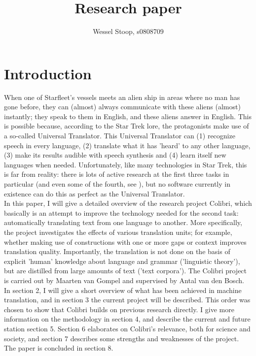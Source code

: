\documentclass[12pt]{article}
\title{Research paper}
\author{Wessel Stoop, s0808709}
\begin{document}
\maketitle

\section{Introduction}

When one of Starfleet's vessels meets an alien ship in areas where no man has gone before, they can (almost) always communicate with these aliens (almost) instantly; they speak to them in English, and these aliens answer in English. This is possible because, according to the Star Trek lore, the protagonists make use of a so-called Universal Translator. This Universal Translator can (1) recognize speech in every language, (2) translate what it has 'heard' to any other language, (3) make its results audible with speech synthesis and (4) learn itself new languages when needed. Unfortunately, like many technologies in Star Trek, this is far from reality: there is lots of active research at the first three tasks in particular (and even some of the fourth, see \citet{biemann11}), but no software currently in existence can do this as perfect as the Universal Translator. \\\indent
In this paper, I will give a detailed overview of the research project Colibri, which basically is an attempt to improve the technology needed for the second task: automatically translating text from one language to another. More specifically, the project investigates the effects of various translation units; for example, whether making use of constructions with one or more gaps or context improves translation quality. Importantly, the translation is not done on the basis of explicit 'human' knowledge about language and grammar ('linguistic theory'), but are distilled from large amounts of text ('text corpora'). The Colibri project is carried out by Maarten van Gompel and supervised by Antal van den Bosch.
\\\indent
In section 2, I will give a short overview of what has been achieved in machine translation, and in section 3 the current project will be described. This order was chosen to show that Colibri builds on previous research directly. I give more information on the methodology in section 4, and describe the current and future station section 5. Section 6 elaborates on Colibri's relevance, both for science and society, and section 7 describes some strengths and weaknesses of the project. The paper is concluded in section 8.
\end{document}
